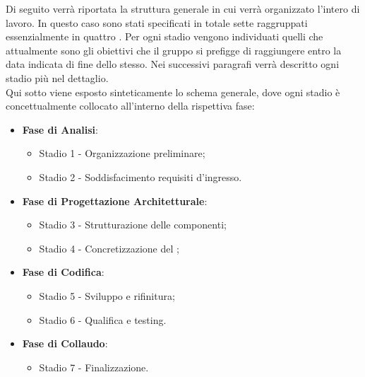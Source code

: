 Di seguito verrà riportata la struttura generale in cui verrà organizzato l'intero  di lavoro. In questo caso sono stati specificati in totale sette  raggruppati essenzialmente in quattro . Per ogni stadio vengono individuati quelli che attualmente sono gli obiettivi che il gruppo \Gruppo{} si prefigge di raggiungere entro la data indicata di fine dello stesso. Nei successivi paragrafi verrà descritto ogni stadio più nel dettaglio.\\
Qui sotto viene esposto sinteticamente lo schema generale, dove ogni stadio è concettualmente collocato all'interno della rispettiva fase:

\begin{itemize}
    \item \textbf{Fase di Analisi}:
    \begin{itemize}
        \item Stadio 1 - Organizzazione preliminare;
        \item Stadio 2 - Soddisfacimento requisiti d'ingresso.
    \end{itemize}

    \item \textbf{Fase di Progettazione Architetturale}:
    \begin{itemize}
        \item Stadio 3 - Strutturazione delle componenti;
        \item Stadio 4 - Concretizzazione del ;
    \end{itemize}

    \item \textbf{Fase di Codifica}:
    \begin{itemize}  
        \item Stadio 5 - Sviluppo e rifinitura;
        \item Stadio 6 - Qualifica e testing.
    \end{itemize}

    \item \textbf{Fase di Collaudo}:
    \begin{itemize}        
        \item Stadio 7 - Finalizzazione.
    \end{itemize}
\end{itemize}

